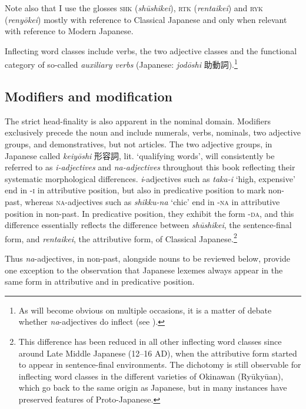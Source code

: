\documentclass [output=book,colorlinks,citecolor=brown]{langscibook}
\begin{document}
{\par


Note also that I use the glosses \textsc{shk} (\textit{shūshikei}), \textsc{rtk} (\textit{rentaikei}) and \textsc{ryk} (\textit{renyōkei}) mostly with reference to Classical Japanese and only when relevant with reference to Modern Japanese.} Inflecting word classes include verbs, the two adjective classes and the functional category of so-called \textit{auxiliary verbs} (Japanese: \textit{jodōshi} 助動詞).\footnote{As will become obvious on multiple occasions, it is a matter of debate whether \textit{na}-adjectives do inflect (see \citealt{uehara:1998:syntactic, kishimoto:2016:lexical}).}

\subsection{Modifiers and modification}

The strict head-finality is also apparent in the nominal domain. Modifiers exclusively precede the noun and include numerals, verbs, nominals, two adjective groups, and demonstratives, but not articles. The two adjective groups, in Japanese called \textit{keiyōshi} 形容詞, lit. `qualifying words’, will consistently be referred to as \textit{\textit{i}-adjectives} and \textit{\textit{na}-adjectives} throughout this book reflecting their systematic morphological differences. \textit{i}-adjectives such as \textit{taka-i} `high, expensive’ end in -\textsc{i} in attributive position, but also in predicative position to mark non-past, whereas \textsc{na}-adjectives such as \textit{shikku-na} `chic’ end in -\textsc{na} in attributive position in non-past. In predicative position, they exhibit the form -\textsc{da}, and this difference essentially reflects the difference between \textit{shūshikei}, the sentence-final form, and \textit{rentaikei}, the attributive form, of Classical Japanese.\footnote{This difference has been reduced in all other inflecting word classes since around Late Middle Japanese (12–16 AD), when the attributive form started to appear in sentence-final environments. The dichotomy is still observable for inflecting word classes in the different varieties of Okinawan (Ryūkyūan), which go back to the same origin as Japanese, but in many instances have preserved features of Proto-Japanese.}

Thus \textit{na}-adjectives, in non-past, alongside nouns to be reviewed below, provide one exception to the observation that Japanese lexemes always appear in the same form in attributive and in predicative position. %
\end{document}
